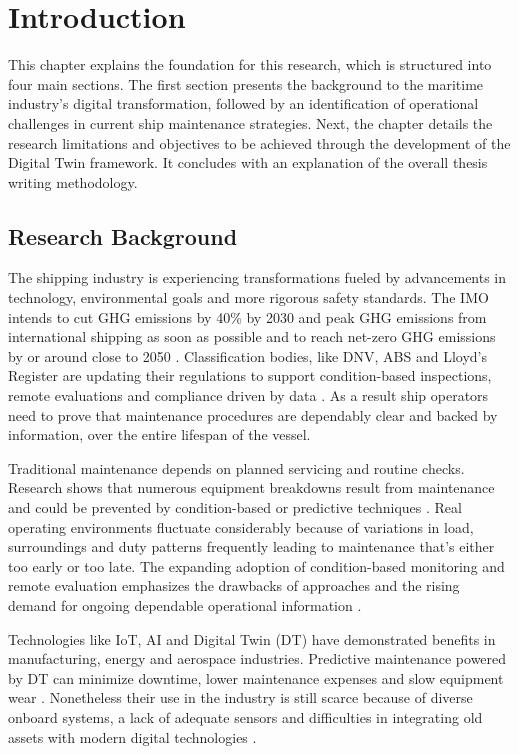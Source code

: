 \chapter{Introduction}
\label{introduction}

This chapter explains the foundation for this research, which is structured into four main sections. The first section presents the background to the maritime industry's digital transformation, followed by an identification of operational challenges in current ship maintenance strategies. Next, the chapter details the research limitations and objectives to be achieved through the development of the Digital Twin framework. It concludes with an explanation of the overall thesis writing methodology.

\section{Research Background}
\label{section:research-background}

The shipping industry is experiencing transformations fueled by advancements in technology, environmental goals and more rigorous safety standards. The IMO intends to cut GHG emissions by 40\% by 2030 and peak GHG emissions from international shipping as soon as possible and to reach net-zero GHG emissions by or around close to 2050 \cite{IMO2023}. Classification bodies, like DNV, ABS and Lloyd’s Register are updating their regulations to support condition-based inspections, remote evaluations and compliance driven by data \cite{ABS2022}. As a result ship operators need to prove that maintenance procedures are dependably clear and backed by information, over the entire lifespan of the vessel.

Traditional maintenance depends on planned servicing and routine checks. Research shows that numerous equipment breakdowns result from maintenance and could be prevented by condition-based or predictive techniques \cite{Madusanka2023}. Real operating environments fluctuate considerably because of variations in load, surroundings and duty patterns frequently leading to maintenance that's either too early or too late. The expanding adoption of condition-based monitoring and remote evaluation emphasizes the drawbacks of approaches and the rising demand for ongoing dependable operational information \cite{Assani2022}.

Technologies like IoT, AI and Digital Twin (DT) have demonstrated benefits in manufacturing, energy and aerospace industries. Predictive maintenance powered by DT can minimize downtime, lower maintenance expenses and slow equipment wear \cite{Miao2024}. Nonetheless their use in the industry is still scarce because of diverse onboard systems, a lack of adequate sensors and difficulties in integrating old assets with modern digital technologies \cite{Wang2022}.


